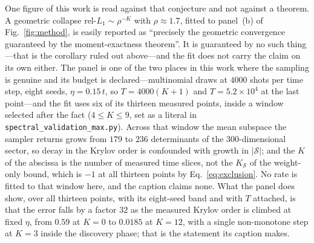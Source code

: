 One figure of this work is read against that conjecture and not against a theorem. A geometric collapse $\text{rel-}L_1\sim\rho^{-K}$ with $\rho\approx1.7$, fitted to panel~(b) of Fig.~\ref{fig:method}, is easily reported as ``precisely the geometric convergence guaranteed by the
moment-exactness theorem''. It is guaranteed by no such thing---that is the corollary ruled out
above---and the fit does not carry the claim on its own either. The panel is one of the two places in this work where
the sampling is genuine and its budget is declared---multinomial draws at $4000$ shots per time step,
eight seeds, $\eta=0.15\,t$, so $T=4000(K{+}1)$ and $T=5.2\times10^{4}$ at the last
point---and the fit uses six of its thirteen measured points, inside a window selected after the fact
($4\le K\le9$, set as a literal in \texttt{spectral\_validation\_max.py}). Across that window the mean
subspace the sampler returns grows from $179$ to $236$ determinants of the $300$-dimensional sector, so
decay in the Krylov order is confounded with growth in $|\mathcal S|$; and the $K$ of the abscissa is
the number of measured time slices, not the $K_{\mathcal S}$ of the weight-only bound, which is $-1$ at
all thirteen points by Eq.~\eqref{eq:exclusion}. No rate is fitted to that window here, and the
caption claims none.
What the panel does show, over all thirteen points, with its eight-seed band and with $T$ attached, is
that the error falls by a factor $32$ as the measured Krylov order is climbed at fixed $\eta$, from
$0.59$ at $K=0$ to $0.0185$ at $K=12$, with a single non-monotone step at $K=3$ inside the discovery
phase; that is the statement its caption makes.

